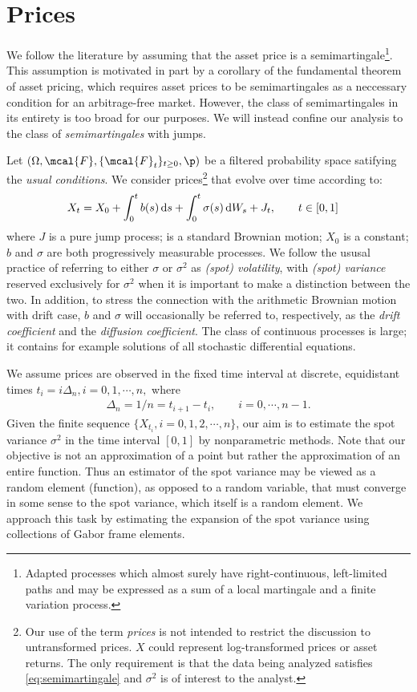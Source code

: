 
\section{Prices} \label{sec:model}
We follow the literature by assuming that the asset price is a semimartingale\footnote{Adapted processes which almost surely have  right-continuous, left-limited paths and  may be expressed as a sum of a local martingale and a finite variation process.}. This assumption is motivated in part by a corollary of  the fundamental theorem of asset pricing, which requires asset prices to be semimartingales as a neccessary   condition for an arbitrage-free market. However, the class of semimartingales in its entirety  is  too broad for our purposes. We will instead confine our analysis to the class of   \emph{\ito  semimartingales} with \levy jumps.


Let $(\Omega, \mcal{F}, \{\mcal{F}_t\}_{t \ge 0}, \p)$ be a filtered probability space satifying the \emph{usual conditions}. We consider prices\footnote{Our use of the term \emph{prices}  is not intended to restrict the  discussion  to untransformed prices. $X$ could  represent log-transformed prices or asset returns. The only requirement is that the data being analyzed   satisfies \eqref{eq:semimartingale} and $\sigma^2$ is of interest to the analyst.}    
 that evolve over time according to:
\begin{align}
  X_t & = X_0 + \int_0^t b(s) \D s + \int_0^t \sigma(s) \D W_s   + J_t, \qquad t \in [0,1]  
  \label{eq:semimartingale}
\end{align}
where $J$ is a pure jump \levy  process; \sbm is a standard Brownian motion;  $X_0$ is a constant;   $b$ and $\sigma$  are both progressively measurable  processes. We follow the ususal practice of referring to either $\sigma$ or $\sigma^2$  as \emph{(spot) volatility}, with \emph{(spot) variance} reserved exclusively for $\sigma^2$ when it is important to make a  distinction between the two. In addition, to stress the connection with the arithmetic Brownian motion with drift case, $b$ and $\sigma$ will occasionally be referred to, respectively, as the \emph{drift coefficient} and the \emph{diffusion coefficient}. 
 The class of continuous \ito processes is large; it contains for example   solutions of all stochastic differential equations.


 We assume prices are observed in the fixed time interval \domain at discrete, equidistant times $t_i = i \Delta_n, i= 0,1,\cdots,n, $ where 
 \begin{align}
   \Delta_n = 1/n = t_{i + 1} - t_i, \qquad i = 0, \cdots, n-1.
   \label{}
 \end{align}
 Given the finite sequence  $\{X_{t_i}, i=0,1,2,\cdots,n\}$, our aim is to estimate the spot variance $\sigma^2$ in the time interval $[0,1]$ by nonparametric methods. Note that our objective is not an approximation of a point but rather the approximation of an entire function. Thus an estimator of the spot variance may be viewed as a  random element (function), as opposed to a random variable, that must converge in some sense to the spot variance, which itself is a random element. We approach this task  by estimating the expansion of the spot variance using   collections of  Gabor frame elements.
